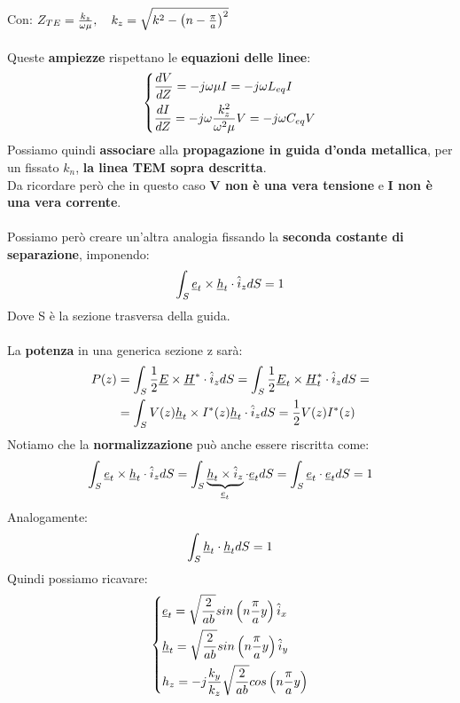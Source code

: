 Con: $Z_{TE} =  \frac{k_z}{\omega \mu}, \quad k_z = \sqrt{k^2 - \left(n - \frac{\pi}{a}\right)^2}$\\ \\
Queste \textbf{ampiezze} rispettano le \textbf{equazioni delle linee}:
\begin{equation*}
    \begin{dcases}
        \frac{dV}{dZ} = -j \omega \mu I = -j \omega L_{eq} I\\
        \frac{dI}{dZ} = -j \omega \frac{k_z^2}{\omega^2 \mu} V = -j \omega C_{eq} V
    \end{dcases}
\end{equation*}
Possiamo quindi \textbf{associare} alla \textbf{propagazione in guida d'onda metallica}, per un fissato $k_n$, \textbf{la linea  TEM sopra descritta}.\\ 
Da ricordare però che in questo caso \textbf{V non è una vera tensione} e \textbf{I non è una vera corrente}.\\ \\
Possiamo però creare un'altra analogia fissando la \textbf{seconda costante di separazione}, imponendo:
\begin{equation*}
    \int_S \underline{e}_t \times \underline{h}_t \cdot \hat{i}_z dS = 1
\end{equation*}
Dove S è la sezione trasversa della guida.\\ \\
La \textbf{potenza} in una generica sezione z sarà:
\begin{equation*}
    \begin{aligned}
        P(z) &= \int_S \frac{1}{2} \underline{E} \times \underline{H}^* \cdot \hat{i}_z dS =  \int_S \frac{1}{2} \underline{E}_t \times \underline{H}_t^* \cdot \hat{i}_z dS =\\
        &= \int_S  V(z) \underline{h}_t \times I^*(z) \underline{h}_t \cdot \hat{i}_z dS = \frac{1}{2} V(z) I^*(z)
    \end{aligned}
\end{equation*}
Notiamo che la \textbf{normalizzazione} può anche essere riscritta come:
\begin{equation*}
    \int_S \underline{e}_t \times \underline{h}_t \cdot \hat{i}_z dS= \int_S \underbrace{\underline{h}_t \times  \hat{i}_z}_{\underline{e}_t} \cdot \underline{e}_t dS = \int_S \underline{e}_t  \cdot \underline{e}_t dS = 1
\end{equation*}
Analogamente:
\begin{equation*}
    \int_S \underline{h}_t  \cdot \underline{h}_t dS = 1
\end{equation*}
Quindi possiamo ricavare:
\begin{equation*}
    \begin{dcases}
        \underline{e}_t = \sqrt{\frac{2}{ab}} sin\left(n \frac{\pi}{a} y\right) \hat{i}_x\\
        \underline{h}_t = \sqrt{\frac{2}{ab}} sin\left(n \frac{\pi}{a} y\right) \hat{i}_y\\
        h_z = -j \frac{k_y}{k_z} \sqrt{\frac{2}{ab}} cos\left(n \frac{\pi}{a} y\right)
    \end{dcases}
\end{equation*}
